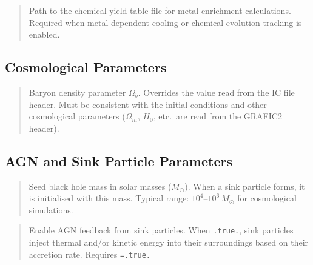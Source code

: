 \begin{quote}
Path to the chemical yield table file for metal enrichment
calculations.  Required when metal-dependent cooling or chemical
evolution tracking is enabled.
\end{quote}

\subsection{Cosmological Parameters}

\label{param:omega_b}

\begin{quote}
Baryon density parameter $\Omega_b$.  Overrides the value read from
the IC file header.  Must be consistent with the initial conditions
and other cosmological parameters ($\Omega_m$, $H_0$, etc.\ are
read from the GRAFIC2 header).
\end{quote}

\subsection{AGN and Sink Particle Parameters}

\label{param:Mseed}

\begin{quote}
Seed black hole mass in solar masses ($M_\odot$).  When a sink
particle forms, it is initialised with this mass.  Typical range:
$10^4$--$10^6\,M_\odot$ for cosmological simulations.
\end{quote}

\label{param:sink_AGN}

\begin{quote}
Enable AGN feedback from sink particles.  When \texttt{.true.}, sink
particles inject thermal and/or kinetic energy into their surroundings
based on their accretion rate.  Requires
\texttt{=.true.}
\end{quote}

\label{param:bondi}

